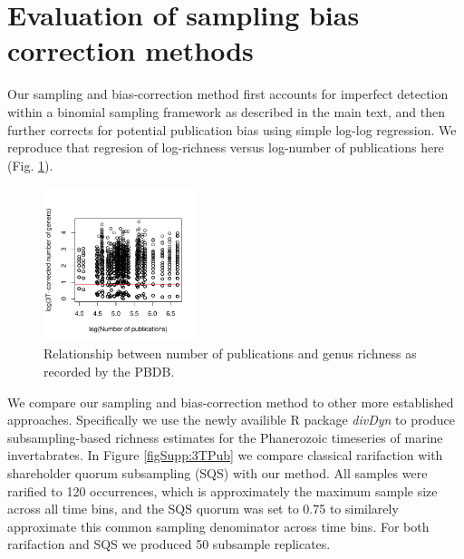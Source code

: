 \documentclass[12pt]{article}
\let\citep=\cite
\begin{document}
\section{Evaluation of sampling bias correction methods}
\label{sec:suppBiasEval}

Our sampling and bias-correction method first accounts for imperfect
detection within a binomial sampling framework as described in the
main text, and then further corrects for potential publication bias
using simple log-log regression.  We reproduce that regresion of
log-richness versus log-number of publications here
(Fig. \ref{figSupp:divByPub}). 

\begin{figure}[!hp]
  \centering
  \includegraphics[width=0.4\textwidth]{../../figSupp_divByPub.pdf}
  \caption[Relationship between number of publications and genus
  richness]{Relationship between number of publications and genus
    richness as recorded by the PBDB.}
  \label{figSupp:divByPub}
\end{figure}


We compare our sampling and bias-correction method to other more
established approaches. Specifically we use the newly availible R
package {\it divDyn} \citep{kocsis2018} to produce subsampling-based
richness estimates for the Phanerozoic timeseries of marine
invertabrates. In Figure \ref{figSupp:3TPub} we compare classical
rarifaction with shareholder quorum subsampling (SQS) with our
method. All samples were rarified to 120 occurrences, which is
approximately the maximum sample size across all time bins, and the
SQS quorum was set to 0.75 to similarely approximate this common
sampling denominator across time bins. For both rarifaction and SQS we
produced 50 subsample replicates.
\end{document}
